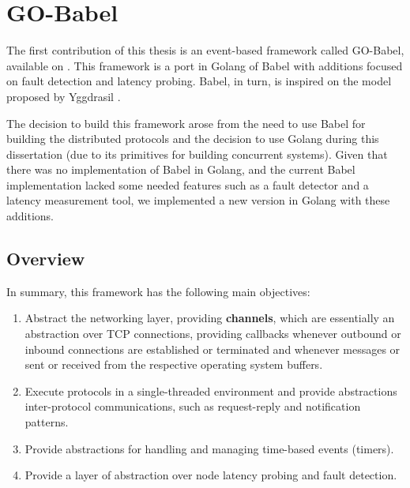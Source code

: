 

\chapter{GO-Babel}
\label{cha:GO-Babel}

The first contribution of this thesis is an event-based framework called GO-Babel, available on  \cite{goBabel}. This framework is a port in Golang \cite{golang} of Babel \cite{babel} with additions focused on fault detection and latency probing. Babel, in turn, is inspired on the model proposed by Yggdrasil \cite{akosThesis}.

The decision to build this framework arose from the need to use Babel for building the distributed protocols and the decision to use Golang during this dissertation (due to its primitives for building concurrent systems). Given that there was no implementation of Babel in Golang, and the current Babel implementation lacked some needed features such as a fault detector and a latency measurement tool, we implemented a new version in Golang with these additions.

\section{Overview}

In summary, this framework has the following main objectives:

\begin{enumerate}

    \item Abstract the networking layer, providing \textbf{channels}, which are essentially an abstraction over TCP connections, providing callbacks whenever outbound or inbound connections are established or terminated and whenever messages or sent or received from the respective operating system buffers.

    \item Execute protocols in a single-threaded environment and provide abstractions inter-protocol communications, such as request-reply and notification patterns.
    
    \item Provide abstractions for handling and managing time-based events (timers).

    \item Provide a layer of abstraction over node latency probing and fault detection.

\end{enumerate}

